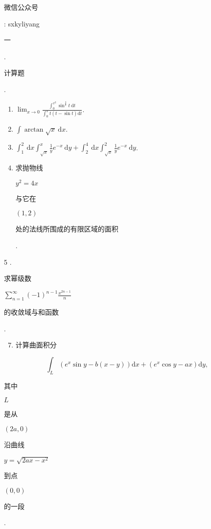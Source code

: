 \documentclass[10pt]{article}
\begin{document}
\begin{CJK}{UTF8}{mj}微信公众号\end{CJK}: sxkyliyang

\begin{CJK}{UTF8}{mj}一\end{CJK}. \begin{CJK}{UTF8}{mj}计算题\end{CJK}.

\begin{enumerate}
  \item $\lim _{x \rightarrow 0} \frac{\int_{0}^{x^{2}} \sin ^{\frac{3}{2}} t \mathrm{~d} t}{\int_{0}^{x} t(t-\sin t) \mathrm{d} t}$.

  \item $\int \arctan \sqrt{x} \mathrm{~d} x$.

  \item $\int_{1}^{2} \mathrm{~d} x \int_{\sqrt{x}}^{x} \frac{1}{y} e^{-x} \mathrm{~d} y+\int_{2}^{4} \mathrm{~d} x \int_{\sqrt{x}}^{2} \frac{1}{y} e^{-x} \mathrm{~d} y$.

  \item \begin{CJK}{UTF8}{mj}求抛物线\end{CJK} $y^{2}=4 x$ \begin{CJK}{UTF8}{mj}与它在\end{CJK} $(1,2)$ \begin{CJK}{UTF8}{mj}处的法线所围成的有限区域的面积\end{CJK}.

\end{enumerate}
5 . \begin{CJK}{UTF8}{mj}求幂级数\end{CJK} $\sum_{n=1}^{\infty}(-1)^{n-1} \frac{x^{2 n-1}}{n}$ \begin{CJK}{UTF8}{mj}的收敛域与和函数\end{CJK}.

\begin{enumerate}
  \setcounter{enumi}{6}
  \item \begin{CJK}{UTF8}{mj}计算曲面积分\end{CJK}
\end{enumerate}
$$
\int_{L}\left(e^{x} \sin y-b(x-y)\right) \mathrm{d} x+\left(e^{x} \cos y-a x\right) \mathrm{d} y,
$$
\begin{CJK}{UTF8}{mj}其中\end{CJK} $L$ \begin{CJK}{UTF8}{mj}是从\end{CJK} $(2 a, 0)$ \begin{CJK}{UTF8}{mj}沿曲线\end{CJK} $y=\sqrt{2 a x-x^{2}}$ \begin{CJK}{UTF8}{mj}到点\end{CJK} $(0,0)$ \begin{CJK}{UTF8}{mj}的一段\end{CJK}.
\end{document}

